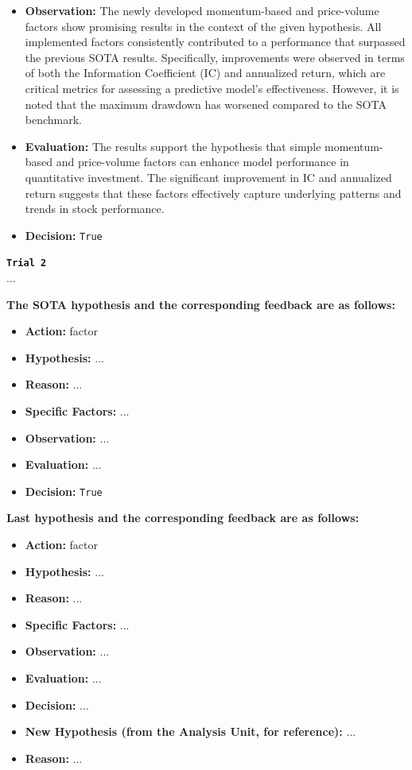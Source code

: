 \documentclass{article}
\begin{document}
\begin{tcolorbox}[
  colback=gray!5, 
  colframe=gray!80,
  title style={fontupper=\bfseries\large},
  title=Hypothesis Synthesis Prompt – Factor-Oriented,
  breakable
]
\begin{itemize}
  \item \textbf{Observation:} The newly developed momentum-based and price-volume factors show promising results in the context of the given hypothesis. All implemented factors consistently contributed to a performance that surpassed the previous SOTA results. Specifically, improvements were observed in terms of both the Information Coefficient (IC) and annualized return, which are critical metrics for assessing a predictive model's effectiveness. However, it is noted that the maximum drawdown has worsened compared to the SOTA benchmark.
  \item \textbf{Evaluation:} The results support the hypothesis that simple momentum-based and price-volume factors can enhance model performance in quantitative investment. The significant improvement in IC and annualized return suggests that these factors effectively capture underlying patterns and trends in stock performance.
  \item \textbf{Decision:} \texttt{True}
\end{itemize}
\vspace{1mm}
\texttt{\textbf{Trial 2}}\\
...

\vspace{1mm}
\textbf{The SOTA hypothesis and the corresponding feedback are as follows:}
\begin{itemize}
  \item \textbf{Action:} factor
  \item \textbf{Hypothesis:} ...
  \item \textbf{Reason:} ...
  \item \textbf{Specific Factors:} ...
  \item \textbf{Observation:} ...
  \item \textbf{Evaluation:} ...
  \item \textbf{Decision:} \texttt{True}
\end{itemize}

\vspace{1mm}
\textbf{Last hypothesis and the corresponding feedback are as follows:}
\begin{itemize}
  \item \textbf{Action:} factor
  \item \textbf{Hypothesis:} ...
  \item \textbf{Reason:} ...
  \item \textbf{Specific Factors:} ...
  \item \textbf{Observation:} ...
  \item \textbf{Evaluation:} ...
  \item \textbf{Decision:} ...
  \item \textbf{New Hypothesis (from the Analysis Unit, for reference):} ...
  \item \textbf{Reason:} ...
\end{itemize}


\end{tcolorbox}
\end{document}
